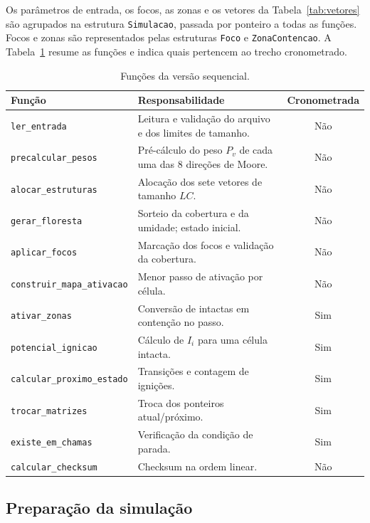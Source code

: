 \documentclass[12pt,a4paper]{article}
\begin{document}
Os parâmetros de entrada, os focos, as zonas e os vetores da
Tabela~\ref{tab:vetores} são agrupados na estrutura \texttt{Simulacao},
passada por ponteiro a todas as funções. Focos e zonas são representados
pelas estruturas \texttt{Foco} e \texttt{ZonaContencao}. A
Tabela~\ref{tab:funcoes-seq} resume as funções e indica quais pertencem
ao trecho cronometrado.

\begin{table}[H]
\centering
\caption{Funções da versão sequencial.}
\label{tab:funcoes-seq}
\begin{tabularx}{\linewidth}{lXc}
\toprule
\textbf{Função} & \textbf{Responsabilidade} & \textbf{Cronometrada} \\
\midrule
\texttt{ler\_entrada} & Leitura e validação do arquivo e dos limites de tamanho. & Não \\
\texttt{precalcular\_pesos} & Pré-cálculo do peso $P_v$ de cada uma das 8 direções de Moore. & Não \\
\texttt{alocar\_estruturas} & Alocação dos sete vetores de tamanho $LC$. & Não \\
\texttt{gerar\_floresta} & Sorteio da cobertura e da umidade; estado inicial. & Não \\
\texttt{aplicar\_focos} & Marcação dos focos e validação da cobertura. & Não \\
\texttt{construir\_mapa\_ativacao} & Menor passo de ativação por célula. & Não \\
\texttt{ativar\_zonas} & Conversão de intactas em contenção no passo. & Sim \\
\texttt{potencial\_ignicao} & Cálculo de $I_i$ para uma célula intacta. & Sim \\
\texttt{calcular\_proximo\_estado} & Transições e contagem de ignições. & Sim \\
\texttt{trocar\_matrizes} & Troca dos ponteiros atual/próximo. & Sim \\
\texttt{existe\_em\_chamas} & Verificação da condição de parada. & Sim \\
\texttt{calcular\_checksum} & Checksum na ordem linear. & Não \\
\bottomrule
\end{tabularx}
\end{table}

\subsection{Preparação da simulação}
\end{document}
